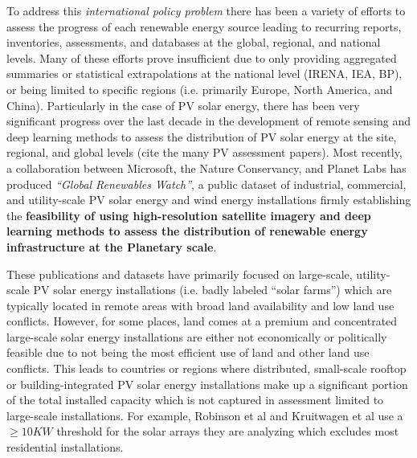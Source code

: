 To address this \textit{international policy problem} there has been a variety of efforts to assess the progress of each renewable energy source leading to recurring reports, inventories, assessments, and databases at the global, 
regional, and national levels. Many of these efforts prove insufficient due to only providing aggregated summaries or statistical extrapolations at the national level (IRENA, IEA, BP), or being limited to specific regions 
(i.e. primarily Europe, North America, and China). Particularly in the case of PV solar energy, there has been very significant progress over the last decade in the development of remote sensing and deep learning methods to assess 
the distribution of PV solar energy at the site, regional, and global levels (cite the many PV assessment papers).
Most recently, a collaboration between Microsoft, the Nature Conservancy, and Planet Labs\cite{robinson_ms_planet_global_renewables_watch_2025} has produced \textit{``Global Renewables Watch''}, 
a public dataset of industrial, commercial, and utility-scale PV solar energy and wind energy installations firmly establishing the \textbf{feasibility of using high-resolution satellite imagery and deep learning methods 
to assess the distribution of renewable energy infrastructure at the Planetary scale}.

These publications and datasets have primarily focused on large-scale, utility-scale PV solar energy installations (i.e. badly labeled ``solar farms'') which are 
typically located in remote areas with broad land availability and low land use conflicts. However, for some places, land comes at a premium and concentrated large-scale solar energy installations are 
either not economically or politically feasible due to not being the most efficient use of land and other land use conflicts. This leads to countries or regions where distributed, small-scale rooftop or building-integrated 
PV solar energy installations make up a significant portion of the total installed capacity which is not captured in assessment limited to large-scale installations. 
For example, Robinson et al\cite{robinson_ms_planet_global_renewables_watch_2025} and Kruitwagen et al\cite{kruitwagen_global_inventory_pv_units_2021} use a $\ge10KW$ threshold for the solar arrays they are analyzing which excludes most residential installations.  

